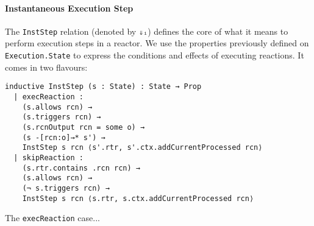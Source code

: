 \paragraph{Instantaneous Execution Step}

The \lstinline{InstStep} relation (denoted by \lstinline{⇓ᵢ}) defines the core of what it means to perform execution steps in a reactor.
We use the properties previously defined on \lstinline{Execution.State} to express the conditions and effects of executing reactions.
It comes in two flavours:

\begin{lstlisting}
inductive InstStep (s : State) : State → Prop 
  | execReaction : 
    (s.allows rcn) →
    (s.triggers rcn) →
    (s.rcnOutput rcn = some o) →
    (s -[rcn:o]→* s') →
    InstStep s rcn ⟨s'.rtr, s'.ctx.addCurrentProcessed rcn⟩
  | skipReaction :
    (s.rtr.contains .rcn rcn) →
    (s.allows rcn) →
    (¬ s.triggers rcn) →
    InstStep s rcn ⟨s.rtr, s.ctx.addCurrentProcessed rcn⟩
\end{lstlisting}


The \lstinline{execReaction} case...
